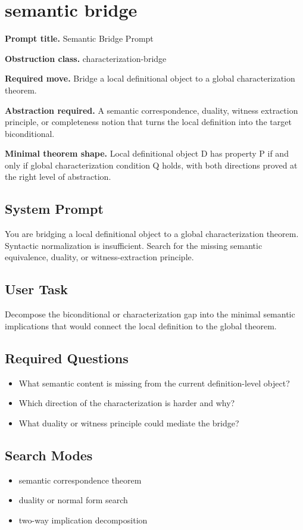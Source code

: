 \documentclass[11pt]{article}
\begin{document}
\section{semantic bridge}
\textbf{Prompt title.} Semantic Bridge Prompt

\textbf{Obstruction class.} characterization-bridge

\textbf{Required move.} Bridge a local definitional object to a global characterization theorem.

\textbf{Abstraction required.} A semantic correspondence, duality, witness extraction principle, or completeness notion that turns the local definition into the target biconditional.

\textbf{Minimal theorem shape.} Local definitional object D has property P if and only if global characterization condition Q holds, with both directions proved at the right level of abstraction.

\subsection*{System Prompt}
You are bridging a local definitional object to a global characterization theorem. Syntactic normalization is insufficient. Search for the missing semantic equivalence, duality, or witness-extraction principle.

\subsection*{User Task}
Decompose the biconditional or characterization gap into the minimal semantic implications that would connect the local definition to the global theorem.

\subsection*{Required Questions}
\begin{itemize}[leftmargin=*,itemsep=0.2em]
\item What semantic content is missing from the current definition-level object?
\item Which direction of the characterization is harder and why?
\item What duality or witness principle could mediate the bridge?
\end{itemize}
\subsection*{Search Modes}
\begin{itemize}[leftmargin=*,itemsep=0.2em]
\item semantic correspondence theorem
\item duality or normal form search
\item two-way implication decomposition
\end{itemize}
\end{document}
